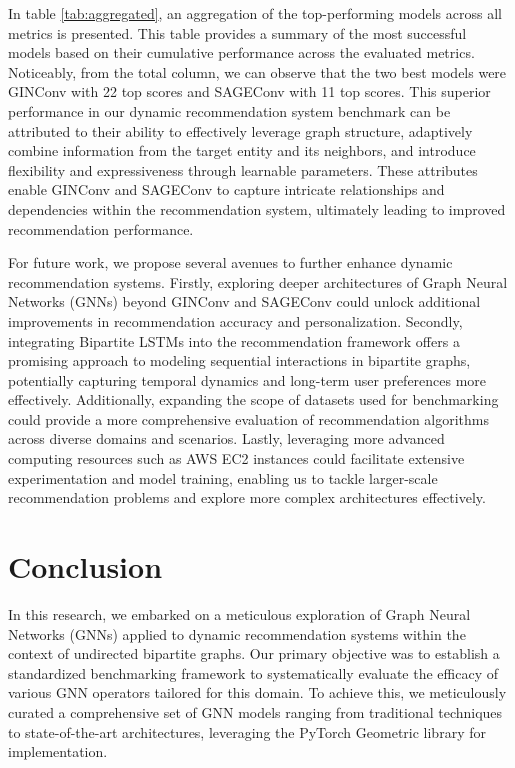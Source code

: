 \documentclass[bst/sn-nature]{sn-jnl}
\begin{document}
\begin{multicols}{2}
\quad In table \ref{tab:aggregated}, an aggregation of the top-performing models across all metrics is presented. This table provides a summary of the most successful models based on their cumulative performance across the evaluated metrics. Noticeably, from the total column, we can observe that the two best models were GINConv with 22 top scores and SAGEConv with 11 top scores. This superior performance in our dynamic recommendation system benchmark can be attributed to their ability to effectively leverage graph structure, adaptively combine information from the target entity and its neighbors, and introduce flexibility and expressiveness through learnable parameters. These attributes enable GINConv and SAGEConv to capture intricate relationships and dependencies within the recommendation system, ultimately leading to improved recommendation performance.

For future work, we propose several avenues to further enhance dynamic recommendation systems. Firstly, exploring deeper architectures of Graph Neural Networks (GNNs) beyond GINConv and SAGEConv could unlock additional improvements in recommendation accuracy and personalization. Secondly, integrating Bipartite LSTMs into the recommendation framework offers a promising approach to modeling sequential interactions in bipartite graphs, potentially capturing temporal dynamics and long-term user preferences more effectively. Additionally, expanding the scope of datasets used for benchmarking could provide a more comprehensive evaluation of recommendation algorithms across diverse domains and scenarios. Lastly, leveraging more advanced computing resources such as AWS EC2 instances could facilitate extensive experimentation and model training, enabling us to tackle larger-scale recommendation problems and explore more complex architectures effectively.

\section{Conclusion}

\quad In this research, we embarked on a meticulous exploration of Graph Neural Networks (GNNs) applied to dynamic recommendation systems within the context of undirected bipartite graphs. Our primary objective was to establish a standardized benchmarking framework to systematically evaluate the efficacy of various GNN operators tailored for this domain. To achieve this, we meticulously curated a comprehensive set of GNN models ranging from traditional techniques to state-of-the-art architectures, leveraging the PyTorch Geometric library for implementation.


\end{multicols}
\end{document}
